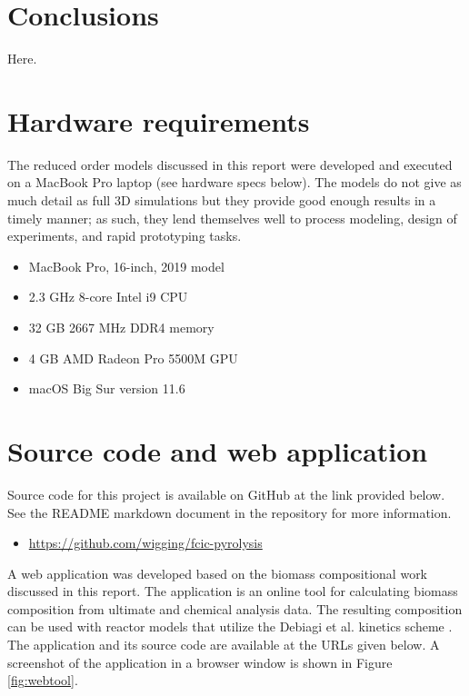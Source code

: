 
\section{Conclusions}

Here.

\section{Hardware requirements}

The reduced order models discussed in this report were developed and executed on a MacBook Pro laptop (see hardware specs below). The models do not give as much detail as full 3D simulations but they provide good enough results in a timely manner; as such, they lend themselves well to process modeling, design of experiments, and rapid prototyping tasks.

\begin{itemize}
    \item MacBook Pro, 16-inch, 2019 model
    \item 2.3 GHz 8-core Intel i9 CPU
    \item 32 GB 2667 MHz DDR4 memory
    \item 4 GB AMD Radeon Pro 5500M GPU
    \item macOS Big Sur version 11.6
\end{itemize}

\section{Source code and web application}

Source code for this project is available on GitHub at the link provided below. See the README markdown document in the repository for more information.

\begin{itemize}
    \item \url{https://github.com/wigging/fcic-pyrolysis}
\end{itemize}

A web application was developed based on the biomass compositional work discussed in this report. The application is an online tool for calculating biomass composition from ultimate and chemical analysis data. The resulting composition can be used with reactor models that utilize the Debiagi et al. kinetics scheme \cite{Debiagi-2018}. The application and its source code are available at the URLs given below. A screenshot of the application in a browser window is shown in Figure \ref{fig:webtool}.

